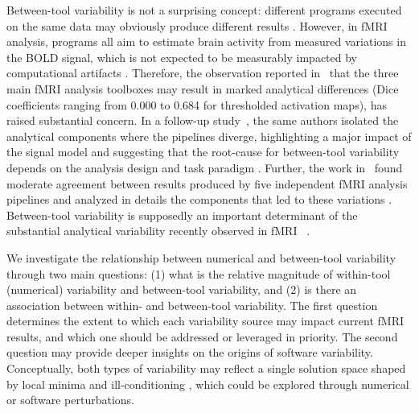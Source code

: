 \documentclass[11pt,onecolumn]{article}
\begin{document}
Between-tool variability is not a surprising concept: different programs
executed on the same data may obviously produce different results . However,
in fMRI analysis, programs all aim to estimate brain activity from measured
variations in the BOLD signal, which is not expected to be measurably
impacted by computational artifacts .  Therefore, the observation reported
in~\cite{bowring2019exploring} that the three main fMRI analysis toolboxes
may result in marked analytical differences (Dice coefficients ranging from
0.000 to 0.684  for thresholded activation maps), has raised substantial
concern. In a follow-up study~\cite{bowring2021isolating}, the same authors
isolated the analytical components where the pipelines diverge,
highlighting a major impact of the signal model and suggesting that the
root-cause for between-tool variability depends on the analysis design and
task paradigm  . Further, the work in~\cite{Li2021.12.01.470790} found
moderate agreement between results produced by five independent fMRI
analysis pipelines and analyzed in details the components that led to these
variations . Between-tool variability is supposedly an important determinant
of the substantial analytical variability recently observed in
fMRI~\cite{botvinik2020variability} .

We investigate the relationship between numerical and between-tool
variability through two main questions: (1) what is the relative magnitude of
within-tool (numerical) variability and between-tool variability, and (2) is there an association between within- and between-tool variability. The first question determines the extent to which each variability
source may impact current fMRI results, and which one should be addressed or leveraged
in priority. The second question may provide deeper insights on the origins
of software variability. Conceptually, both types of variability may
reflect a single solution space shaped by local minima and
ill-conditioning , which could be explored through numerical or software
perturbations.
\end{document}
